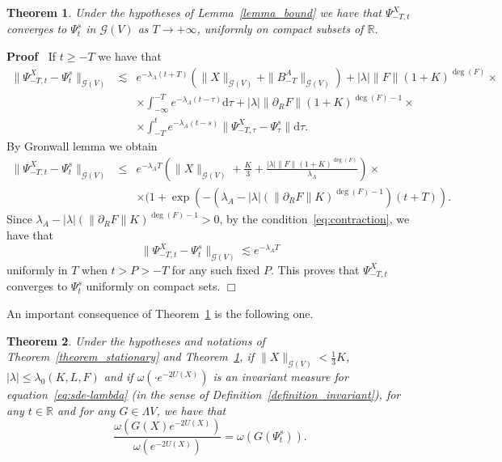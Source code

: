 \documentclass{article}
\newcommand{\mathd}{\mathrm{d}}
\newcommand{\nobracket}{}
\newenvironment{proof}{\noindent\textbf{Proof\ }}{\hspace*{\fill}$\Box$\medskip}
\newtheorem{theorem}{Theorem}
\begin{document}
\begin{theorem}
  \label{theorem_approximation}Under the hypotheses of Lemma~\ref{lemma_bound}
  we have that $\Psi_{- T, t}^X$ converges to $\Psi^s_t$ in $\mathcal{G} (V)$
  as $T \rightarrow + \infty$, uniformly on compact subsets of $\mathbb{R}$.
\end{theorem}

\begin{proof}
  If $t \geqslant - T$ we have that
  \begin{eqnarray}
    \| \Psi_{- T, t}^X - \Psi_t^s \|_{\mathcal{G} (V)} & \lesssim & e^{-
    \lambda_A (t + T)} (\| X \|_{\mathcal{G} (V)} + \| B_{- T}^A
    \|_{\mathcal{G} (V)}) + | \lambda | \| F \| (1 + K)^{\deg (F)} \times
    \nonumber\\
    &  & \times \int_{- \infty}^{- T} e^{- \lambda_A (t - \tau)} \mathd \tau
    + | \lambda | \| \partial_R F \| (1 + K)^{\deg (F) - 1} \times \nonumber\\
    &  & \times \int_{- T}^t e^{- \lambda_A (t - s)} \| \Psi_{- T, \tau}^X -
    \Psi_{\tau}^s \| \mathd \tau . \nonumber
  \end{eqnarray}
  By Gronwall lemma we obtain
  \begin{eqnarray}
    \| \Psi_{- T, t}^X - \Psi_t^s \|_{\mathcal{G} (V)} & \leqslant & e^{-
    \lambda_A T} \left( \| X \|_{\mathcal{G} (V)} + \frac{K}{3} + \frac{|
    \lambda | \| F \| (1 + K)^{\deg (F)}}{\lambda_A} \right) \times
    \nonumber\\
    &  & \times (1 + \exp (- (\lambda_A - | \lambda | (\| \partial_R F \|
    K)^{\deg (F) - 1}) \nobracket (t + T)) . \nonumber
  \end{eqnarray}
  Since $\lambda_A - | \lambda | (\| \partial_R F \| K)^{\deg (F) - 1} > 0$,
  by the condition~{\eqref{eq:contraction}}, we have that
  \[ \| \Psi_{- T, t}^X - \Psi_t^s \|_{\mathcal{G} (V)} \lesssim e^{-
     \lambda_A T} \]
  uniformly in $T$ when $t > P > - T$ for any such fixed $P$. This proves that
  $\Psi_{- T, t}^X$ converges to $\Psi_t^s$ uniformly on compact sets.
\end{proof}

An important consequence of Theorem~\ref{theorem_approximation} is the
following one.

\begin{theorem}
  \label{theorem_invariant2}Under the hypotheses and notations of
  Theorem~\ref{theorem_stationary} and Theorem~\ref{theorem_approximation}, if
  $\| X \|_{\mathcal{G} (V)} < \frac{1}{3} K$, $| \lambda | \leqslant
  \lambda_0 (K, L, F)$ and if $\omega (\cdot e^{- 2 U (X)})$ is an invariant
  measure for equation~{\eqref{eq:sde-lambda}} (in the sense of
  Definition~\ref{definition_invariant}), for any $t \in \mathbb{R}$ and for
  any $G \in \Lambda V$, we have that
  \[ \frac{\omega (G (X) e^{- 2 U (X)})}{\omega (e^{- 2 U (X)})} = \omega (G
     (\Psi^s_t)) . \]
\end{theorem}
\end{document}
